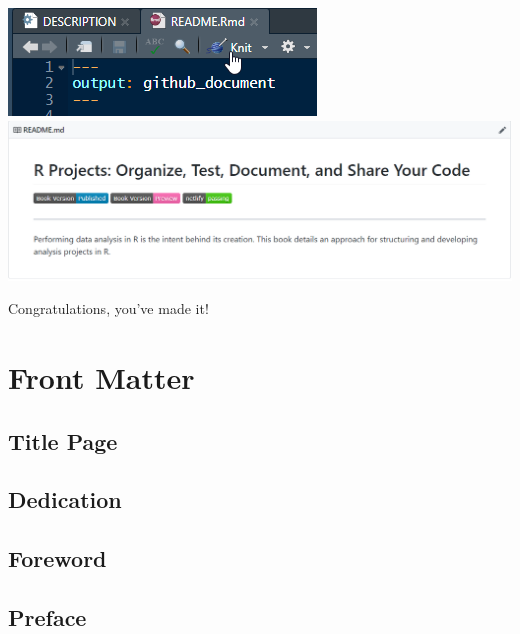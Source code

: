 \documentclass[]{book}
\begin{document}
\begin{center}\includegraphics[width=0.7\linewidth]{images/1d6ec6730103d6654ec4dc8e03c642be} \includegraphics[width=0.7\linewidth]{images/1db9c26c547348c10d24a7f86ce3d3ca} \end{center}

Congratulations, you've made it!

\hypertarget{part-front-matter}{%
\part*{Front Matter}\label{part-front-matter}}

\hypertarget{title-page}{%
\chapter*{Title Page}\label{title-page}}

\hypertarget{dedication}{%
\chapter*{Dedication}\label{dedication}}

\hypertarget{foreword}{%
\chapter*{Foreword}\label{foreword}}

\hypertarget{preface}{%
\chapter*{Preface}\label{preface}}
\end{document}
